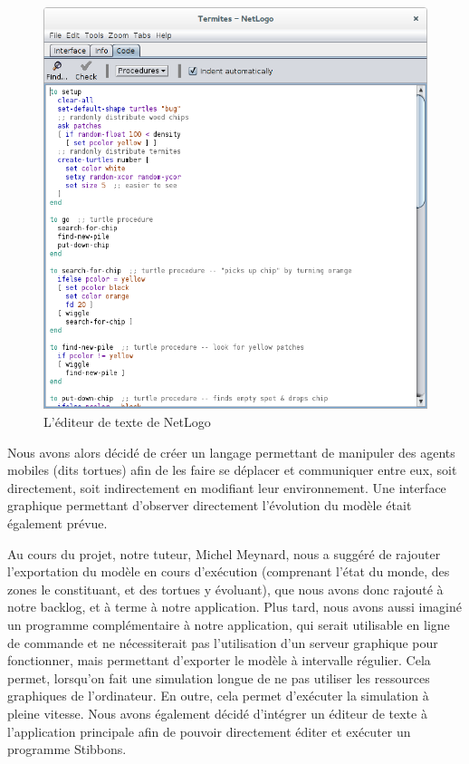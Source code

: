\begin{figure}[h]
\centering
\includegraphics[scale=0.3]{doc/gestionProjet/netlogo-code.png}
\caption{\label{netlogo-code} L'éditeur de texte de NetLogo}
\end{figure}


Nous avons alors décidé de créer un langage permettant de manipuler des agents mobiles (dits tortues) afin de les faire se déplacer et communiquer entre eux, soit directement, soit indirectement en modifiant leur environnement. Une interface graphique permettant d'observer directement l'évolution du modèle était également prévue.

Au cours du projet, notre tuteur, Michel Meynard, nous a suggéré de rajouter l'exportation du modèle en cours d'exécution (comprenant l'état du monde, des zones le constituant, et des tortues y évoluant), que nous avons donc rajouté à notre backlog, et à terme à notre application.
Plus tard, nous avons aussi imaginé un programme complémentaire à notre application, qui serait utilisable en ligne de commande et ne nécessiterait pas l'utilisation d'un serveur graphique pour fonctionner, mais permettant d'exporter le modèle à intervalle régulier.
Cela permet, lorsqu'on fait une simulation longue de ne pas utiliser les ressources graphiques de l'ordinateur. En outre, cela permet d'exécuter la simulation à pleine vitesse.
Nous avons également décidé d'intégrer un éditeur de texte à l'application principale afin de pouvoir directement éditer et exécuter un programme Stibbons.
